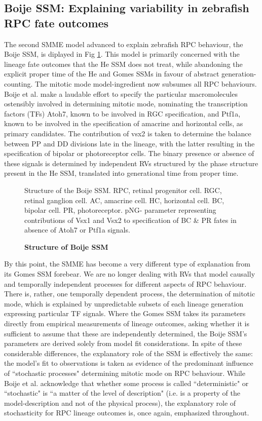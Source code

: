  \subsection{Boije SSM: Explaining variability in zebrafish RPC fate outcomes}
 
The second SMME model advanced to explain zebrafish RPC behaviour, the Boije SSM, is diplayed in Fig \ref{BoijeSSM}. This model is primarily concerned with the lineage fate outcomes that the He SSM does not treat, while abandoning the explicit proper time of the He and Gomes SSMs in favour of abstract generation-counting. The mitotic mode model-ingredient now subsumes all RPC behaviours. Boije et al. make a laudable effort to specify the particular macromolecules ostensibly involved in determining mitotic mode, nominating the transcription factors (TFs) Atoh7, known to be involved in RGC specification, and Ptf1a, known to be involved in the specification of amacrine and horizontal cells, as primary candidates. The contribution of vsx2 is taken to determine the balance between PP and DD divisions late in the lineage, with the latter resulting in the specification of bipolar or photoreceptor cells. The binary presence or absence of these signals is determined by independent RVs structured by the phase structure present in the He SSM, translated into generational time from proper time.

\begin{figure}[!h]
\caption{{\bf Structure of Boije SSM}}
Structure of the Boije SSM. RPC, retinal progenitor cell. RGC, retinal ganglion cell. AC, amacrine cell. HC, horizontal cell. BC, bipolar cell. PR, photoreceptor. pNG- parameter representing contributions of Vsx1 and Vsx2 to specification of BC \& PR fates in absence of Atoh7 or Ptf1a signals.
\label{BoijeSSM}
\end{figure}

By this point, the SMME has become a very different type of explanation from its Gomes SSM forebear. We are no longer dealing with RVs that model causally and temporally independent processes for different aspects of RPC behaviour. There is, rather, one temporally dependent process, the determination of mitotic mode, which is explained by unpredictable subsets of each lineage generation expressing particular TF signals. Where the Gomes SSM takes its parameters directly from empirical measurements of lineage outcomes, asking whether it is sufficient to assume that these are independently determined, the Boije SSM's parameters are derived solely from model fit considerations. In spite of these considerable differences, the explanatory role of the SSM is effectively the same: the model's fit to observations is taken as evidence of the predominant influence of ``stochastic processes" determining mitotic mode on RPC behaviour. While Boije et al. acknowledge that whether some process is called ``deterministic" or ``stochastic" is ``a matter of the level of description"\cite{Boije2015} (i.e. is a property of the model-description and not of the physical process), the explanatory role of stochasticity for RPC lineage outcomes is, once again, emphasized throughout.
 
